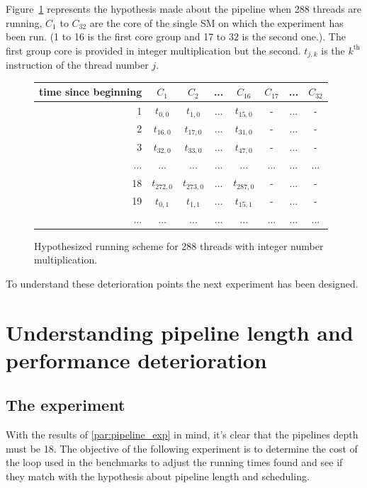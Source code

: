 \documentclass{report}
\begin{document}
    Figure~\ref{fig:int_prediction_256} represents the hypothesis made about the pipeline when 288
    threads are running, $C_1$ to $C_{32}$ are the core of the single SM on which the experiment
    has been run. (1 to 16 is the first core group and 17 to 32 is the second one.). The first
    group core is provided in integer multiplication but the second. $t_{j,k}$ is the $k^{\text{th}}$ instruction of the thread number
    $j$.
   \begin{figure}[H]
      \centering
       \begin{tabular}{ | r || c | c | c | c || c | c | c | }
    	    \hline
    	    time since beginning & $C_1$ & $C_2$ & ... & $C_{16}$ & $C_{17}$ & ... & $C_{32}$ \\ \hline  \hline
    	   1 & $t_{0,0}$ & $t_{1,0}$ & ... & $t_{15,0}$ & - & ... & - \\ \hline 
    	   2 & $t_{16,0}$ & $t_{17,0}$ & ... & $t_{31,0}$ & - & ... & - \\ \hline
    	   3 & $t_{32,0}$ & $t_{33,0}$ & ... & $t_{47,0}$ & - & ... & - \\ \hline
    	   ... & ... & ... & ... & ... & ... & ... & ... \\ \hline
    	   18 & $t_{272,0}$ & $t_{273,0}$ & ... & $t_{287,0}$ & - & ... & - \\ \hline
    	   19 & $t_{0,1}$ & $t_{1,1}$ & ... & $t_{15,1}$ & - & ... & - \\ \hline
    	   ... & ... & ... & ... & ... & ... & ... & ... \\ \hline
  	\end{tabular}
  	\captionsetup{justification=centering}
  	\caption{Hypothesized running scheme for 288 threads with integer number multiplication.}
  	\label{fig:int_prediction_256}
   \end{figure}

    To understand these deterioration points the next experiment has been designed.

\section{Understanding pipeline length and performance deterioration}
    \subsection{The experiment}
    With the results of \ref{par:pipeline_exp} in mind, it's clear that the pipelines depth 
    must be 18. The objective of the following experiment is to determine the cost of
    the loop used in the benchmarks to adjust the running times found and see if they match with
    the hypothesis about pipeline length and scheduling. 
\end{document}
